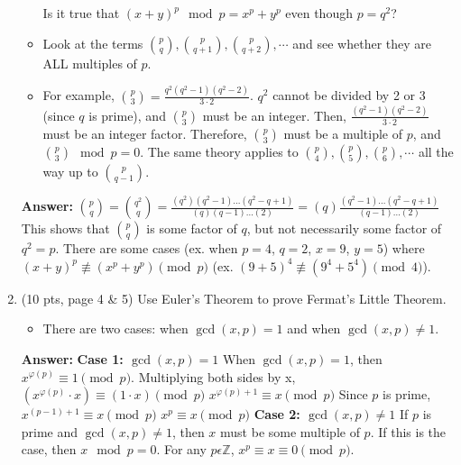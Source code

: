\documentclass[10pt]{article}
\begin{document}
\begin{enumerate}
\begin{itemize}
		Is it true that $(x+y)^p\mod p=x^p+y^p$ even though $p=q^2$?
		\item Look at the terms $\binom{p}{q},\binom{p}{q+1},\binom{p}{q+2},\cdots$ and see whether they are ALL multiples of $p$.
		\item For example, $\binom{p}{3}=\frac{q^2(q^2-1)(q^2-2)}{3\cdot 2}$. $q^2$ cannot be divided by 2 or 3 (since $q$ is prime), and $\binom{p}{3}$ must be an integer. Then, $\frac{(q^2-1)(q^2-2)}{3\cdot 2}$ must be an integer factor. Therefore, $\binom{p}{3}$ must be a multiple of $p$, and $\binom{p}{3}\mod p=0$. The same theory applies to $\binom{p}{4},\binom{p}{5},\binom{p}{6},\cdots$ all the way up to $\binom{p}{q-1}$.
	\end{itemize}

\textbf{Answer:} \newline $\binom{p}{q} = \binom{q^2}{q} = \frac{(q^2)(q^2-1)...(q^2-q+1)}{(q)(q-1)...(2)} = (q)\frac{(q^2-1)...(q^2-q+1)}{(q-1)...(2)}$ \newline This shows that $\binom{p}{q}$ is some factor of $q$, but not necessarily some factor of $q^2 = p$. There are some cases (ex. when $p=4$, $q=2$, $x=9$, $y=5$) where $(x + y)^p\not\equiv (x^p + y^p)\pmod p$ (ex. $(9 + 5)^4\not\equiv (9^4 + 5^4)\pmod 4$).

	\bigskip\item (10 pts, page 4 \& 5) Use Euler's Theorem to prove Fermat's Little Theorem.
	\begin{itemize}
		\item There are two cases: when $\gcd(x,p)=1$ and when $\gcd(x,p)\neq 1$.
	\end{itemize}

\textbf{Answer:} \newline \textbf{Case 1: $\gcd(x,p)=1$} \newline When $\gcd(x,p)=1$, then $x^{\varphi(p)}\equiv 1\pmod p$. Multiplying both sides by x, \newline $(x^{\varphi(p)}\cdot x)\equiv (1\cdot x)\pmod p$ \newline $x^{\varphi(p)+1}\equiv x\pmod p$ \newline Since $p$ is prime, \newline $x^{(p-1)+1}\equiv x\pmod p$ \newline $x^{p}\equiv x\pmod p$ \newline \newline \newline \textbf{Case 2: $\gcd(x,p)\neq 1$} \newline If $p$ is prime and $\gcd(x,p)\neq 1$, then $x$ must be some multiple of $p$. If this is the case, then $x\mod p = 0$. For any $p\epsilon\mathbb{Z}$, $x^p\equiv x\equiv 0\pmod p$. \newline


\end{enumerate}
\end{document}
